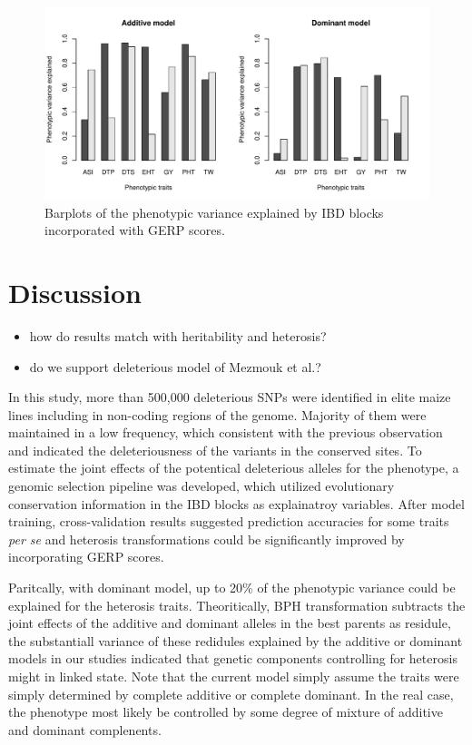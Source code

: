 \documentclass[9pt,twocolumn,twoside]{gsajnl}
\begin{document}
\begin{figure}[htbp]
\centering
\includegraphics[width=\linewidth]{Figure_h2.pdf}
\caption{Barplots of the phenotypic variance explained by IBD blocks incorporated with GERP scores.}
\label{fig:h2}
\end{figure}


\section*{Discussion}

\begin{itemize}
  \item how do results match with heritability and heterosis?
  \item do we support deleterious model of Mezmouk et al.?
\end{itemize}


In this study, more than 500,000 deleterious SNPs were identified in elite maize lines including in non-coding regions of the genome. Majority of them were maintained in a low frequency, which consistent with the previous observation \citep{rodgers2015recombination} and indicated the deleteriousness of the variants in the conserved sites. To estimate the joint effects of the potentical deleterious alleles for the phenotype, a genomic selection pipeline was developed, which utilized evolutionary conservation information in the IBD blocks as explainatroy variables. After model training, cross-validation results suggested prediction accuracies for some traits \emph{per se} and heterosis transformations could be significantly improved by incorporating GERP scores. 

Paritcally, with dominant model, up to 20\% of the phenotypic variance could be explained for the heterosis traits. Theoritically, BPH transformation subtracts the joint effects of the additive and dominant alleles in the best parents as residule, the substantiall variance of these redidules explained by the additive or dominant models in our studies indicated that genetic components controlling for heterosis might in linked state. Note that the current model simply assume the traits were simply determined by complete additive or complete dominant. In the real case, the phenotype most likely be controlled by some degree of mixture of additive and dominant complenents. 
\end{document}
